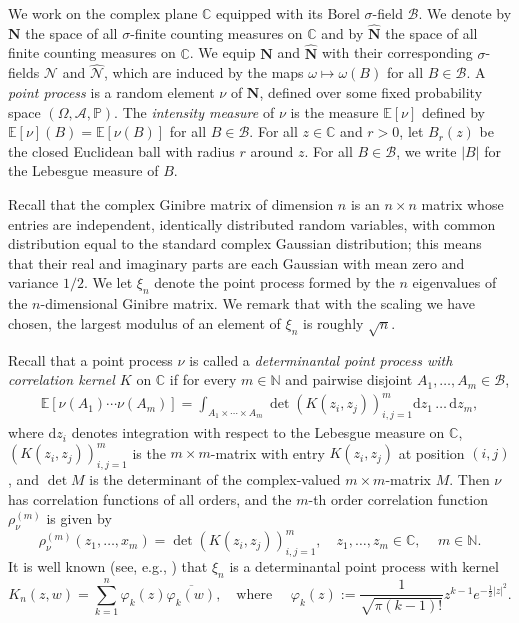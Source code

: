 \documentclass{amsart}
\theoremstyle{plain}
\theoremstyle{definition}
\theoremstyle{remark}
\def\E{\mathbb E}
\def\P{\mathbb P}
\def\d{\mathrm d}
\begin{document}
We  work on the complex plane $\mathbb C$ equipped with its Borel $\sigma$-field $\mathcal B$. We denote by $\mathbf N$  the space of all $\sigma$-finite counting measures on $\mathbb{C}$ and by $\widehat{\mathbf{N}}$ the space of all finite counting measures on $\mathbb{C}$.
We equip $\mathbf N$ and $\widehat{\mathbf{N}}$ with their corresponding $\sigma$-fields $\mathcal N$ and $\widehat{\mathcal N}$, which are induced by the maps $\omega \mapsto \omega(B)$ for all $B \in \mathcal B$. A {\em point process} is a random
element $\nu$ of $\mathbf N$, defined over some fixed
probability space $(\Omega,\mathcal A,\P)$.
The {\em intensity measure} of $\nu$ is the
measure $\E[\nu]$ defined by $\E[\nu](B)=\E[\nu(B)]$ for all $B\in\mathcal B$. 
For all $z \in \mathbb{C}$ and $r>0$,  let $B_r(z)$ be the closed Euclidean ball with radius $r$ around $z$. For all $B \in \mathcal B$, we write $|B|$ for the Lebesgue measure of $B$.

Recall that the complex Ginibre matrix of dimension $n$ is an $n\times n$ matrix whose entries are independent, identically distributed random variables, with common distribution equal to the standard complex Gaussian distribution; this means that their real and imaginary parts are each Gaussian with mean zero and variance $1/2$. 
We let $\xi_n$ denote the point process formed by the $n$ eigenvalues of the $n$-dimensional Ginibre matrix.
We remark that with the scaling we have chosen, the largest modulus of an element of $\xi_n$ is roughly $\sqrt{n}$.

Recall that a point process $\nu$ is called a {\em determinantal point process with correlation kernel $K$} on $\mathbb{C}$ if for every $m\in \mathbb N$ and pairwise disjoint $A_1,\dots,A_m \in \mathcal B$, 
\begin{align*}
	\E [\nu(A_1)\cdots \nu(A_m)]=\int_{A_1 \times \cdots \times A_m} \det (K(z_i,z_j))_{i,j=1}^m \d z_1 \, \dots\, \d z_m, 
\end{align*} 
where $\d z_i$ denotes integration with respect to the Lebesgue measure on $\mathbb{C}$, $(K(z_i,z_j))_{i,j=1}^m$ is the $m\times m$-matrix with entry $K(z_i,z_j)$ at position $(i,j)$, and $\det M$ is the determinant of the complex-valued $m\times m$-matrix $M$. 
Then $\nu$ has correlation functions of all orders, and the $m$-th order correlation function $\rho_\nu^{(m)}$ is given by
\begin{equation*}
	\rho^{(m)}_\nu(z_1,\dots,x_m)=	\det (K(z_i,z_j))_{i,j=1}^m,\quad z_1,\dots,z_m \in \mathbb{C},\,\quad m \in \mathbb{N}.
\end{equation*}
It is well known (see, e.g.,  \cite[Theorem 4.3.10]{BKPV09}) that $\xi_n$ is a determinantal point process with kernel
\begin{equation}\label{e:ginkernel}
K_n(z,w)=\sum_{k=1}^n \varphi_k(z) \overline{\varphi_k(w)},\quad \text{where }\quad \varphi_k(z):=\frac{1}{\sqrt{\pi (k-1)!}} z^{k-1} e^{- \frac{1}{2} |z|^2}.
\end{equation}
\end{document}
